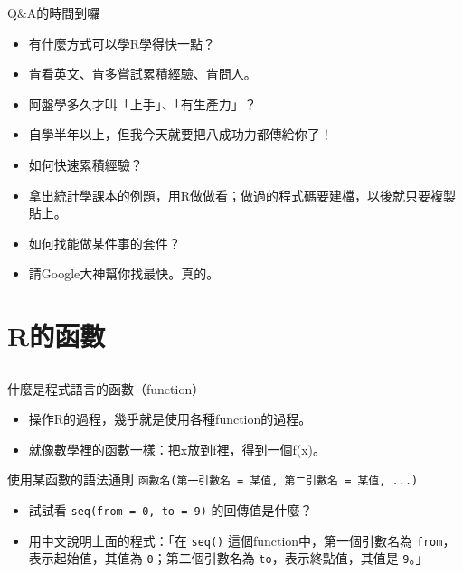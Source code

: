 \documentclass[12pt]{beamer}
\begin{document}
\begin{frame}[fragile]{Q\&A的時間到囉}
\begin{itemize}
\item[Q] 有什麼方式可以學R學得快一點？
\item[A] 肯看英文、肯多嘗試累積經驗、肯問人。
\end{itemize}
\begin{itemize}
\item[Q] 阿盤學多久才叫「上手」、「有生產力」？
\item[A] 自學半年以上，但我今天就要把八成功力都傳給你了！
\end{itemize}
\begin{itemize}
\item[Q] 如何快速累積經驗？
\item[A] 拿出統計學課本的例題，用R做做看；做過的程式碼要建檔，以後就只要複製貼上。
\end{itemize}
\begin{itemize}
\item[Q] 如何找能做某件事的套件？
\item[A] 請Google大神幫你找最快。真的。
\end{itemize}
\end{frame}

\section{R的函數}\subsection{}

\begin{frame}[fragile]{什麼是程式語言的函數（function）}
\begin{itemize}
\item 操作R的過程，幾乎就是使用各種function的過程。
\item 就像數學裡的函數一樣：把x放到f裡，得到一個f(x)。
\end{itemize}

\begin{block}{使用某函數的語法通則}
\verb+函數名(第一引數名 = 某值, 第二引數名 = 某值, ...)+ 
\end{block}

\begin{itemize}
\item 試試看 \verb+seq(from = 0, to = 9)+ 的回傳值是什麼？
\item 用中文說明上面的程式：「在 \verb+seq()+ 這個function中，第一個引數名為 \verb+from+，表示起始值，其值為 \verb+0+；第二個引數名為 \verb+to+，表示終點值，其值是 \verb+9+。」
\end{itemize}
\end{frame}
\end{document}
